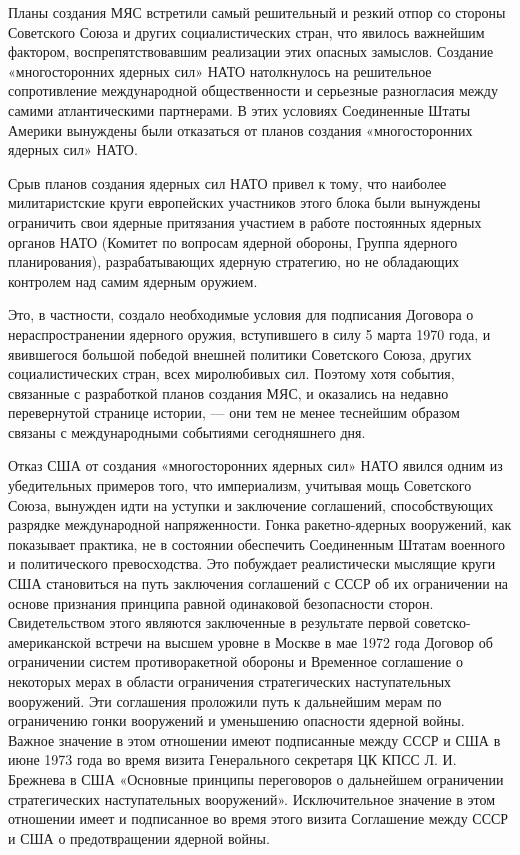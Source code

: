 \documentclass[12pt, a4paper, openany]{book}
\begin{document}
Планы создания МЯС встретили самый решительный и резкий отпор со стороны Советского Союза и других социалистических стран, что явилось важнейшим фактором, воспрепятствовавшим реализации этих опасных замыслов. Создание «многосторонних ядерных сил» НАТО натолкнулось на решительное сопротивление международной общественности и серьезные разногласия между самими атлантическими партнерами. В этих условиях Соединенные Штаты Америки вынуждены были отказаться от планов создания «многосторонних ядерных сил» НАТО.

Срыв планов создания ядерных сил НАТО привел к тому, что наиболее милитаристские круги европейских участников этого блока были вынуждены ограничить свои ядерные притязания участием в работе постоянных ядерных органов НАТО (Комитет по вопросам ядерной обороны, Группа ядерного планирования), разрабатывающих ядерную стратегию, но не обладающих контролем над самим ядерным оружием.

Это, в частности, создало необходимые условия для подписания Договора о нераспространении ядерного оружия, вступившего в силу 5 марта 1970 года, и явившегося большой победой внешней политики Советского Союза, других социалистических стран, всех миролюбивых сил. Поэтому хотя события, связанные с разработкой планов создания МЯС, и оказались на недавно перевернутой странице истории, — они тем не менее теснейшим образом связаны с международными событиями сегодняшнего дня.

Отказ США от создания «многосторонних ядерных сил» НАТО явился одним из убедительных примеров того, что империализм, учитывая мощь Советского Союза, вынужден идти на уступки и заключение соглашений, способствующих разрядке международной напряженности. Гонка ракетно-ядерных вооружений, как показывает практика, не в состоянии обеспечить Соединенным Штатам военного и политического превосходства. Это побуждает реалистически мыслящие круги США становиться на путь заключения соглашений с СССР об их ограничении на основе признания принципа равной одинаковой безопасности сторон. Свидетельством этого являются заключенные в результате первой советско-американской встречи на высшем уровне в Москве в мае 1972 года Договор об ограничении систем противоракетной обороны и Временное соглашение о некоторых мерах в области ограничения стратегических наступательных вооружений. Эти соглашения проложили путь к дальнейшим мерам по ограничению гонки вооружений и уменьшению опасности ядерной войны. Важное значение в этом отношении имеют подписанные между СССР и США в июне 1973 года во время визита Генерального секретаря ЦК КПСС Л. И. Брежнева в США «Основные принципы переговоров о дальнейшем ограничении стратегических наступательных вооружений». Исключительное значение в этом отношении имеет и подписанное во время этого визита Соглашение между СССР и США о предотвращении ядерной войны.
\end{document}
